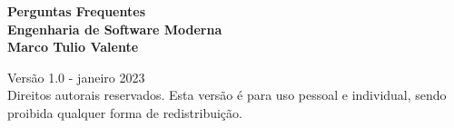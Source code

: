 \thispagestyle{empty}

\newpage
\thispagestyle{empty}
\vspace*{4.5cm}
\begin{center}
{\Huge \bf Perguntas Frequentes}\\ 
\vspace*{0.6cm}
{\Huge \bf Engenharia de Software Moderna}\\ 
\vspace*{3cm}
{\Large \bf Marco Tulio Valente}
\end{center}
\newpage

\thispagestyle{empty}
\vspace*{3cm}
\begin{center}
{\Large  Versão 1.0 - janeiro 2023}\\ 
\vspace*{1cm}
{Direitos autorais reservados. Esta versão é para uso pessoal e individual, sendo proibida qualquer forma de redistribuição.}
\end{center}
\newpage

\tableofcontents
